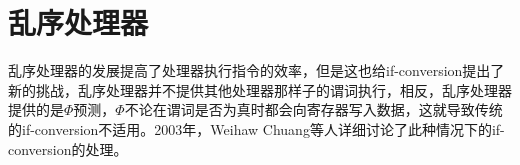 \section{乱序处理器}

乱序处理器的发展提高了处理器执行指令的效率，但是这也给if-conversion提出了新的挑战，乱序处理器并不提供其他处理器那样子的谓词执行，相反，乱序处理器提供的是$\Phi$预测，$\Phi$不论在谓词是否为真时都会向寄存器写入数据，这就导致传统的if-conversion不适用。2003年，Weihaw Chuang等人详细讨论了此种情况下的if-conversion的处理\cite{Chuang}。